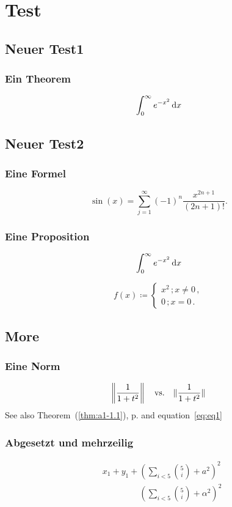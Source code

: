 \chapter{Test}\label{chap:a1}
\section{Neuer Test1}
\subsection{Ein Theorem}
\begin{theorem}\label{thm:a1-1.1}
\[
\int_{0}^{\infty} e^{-x^{2}} \mathop{}\!\mathrm{d}{x}
\]
\end{theorem}
\section{Neuer Test2}
\subsection{Eine Formel}
\begin{equation}\label{eq:eq1}
	\sin(x) = \sum_{j=1}^{\infty} (-1)^{n} \frac{ x^{2n+1} }{ (2n+1)! } .
\end{equation}
\subsection{Eine Proposition}
\begin{proposition}
\[
\int_{0}^{\infty} e^{-x^{2}} \mathop{}\!\mathrm{d}{x}
\]
\end{proposition}
\begin{corollary}
%
\[
	f( x ) \coloneqq 
		\begin{cases}
			x^{ 2 } \, ; x \neq 0 \, , \\
			0 \, ; x = 0 \, .
		\end{cases}
\]
%
\end{corollary}
\section{More}
\subsection{Eine Norm}
%
\[
	\left\|\frac{ 1 }{ 1 + t^{ 2 } }\right\|
	\quad \mbox{vs.} \quad
	 \|\frac{ 1 }{ 1 + t^{ 2 } }\|
\]
%
See also Theorem~(\ref{thm:a1-1.1}), p.\;\pageref{thm:a1-1.1} and equation~\eqref{eq:eq1}

\subsection{Abgesetzt und mehrzeilig}
\begin{align*}
	&x_{1} + y_{1} + \left( \sum_{i < 5} \binom{5}{i} + a^{2} \right)^{2}\\
	&\phantom{x_{1} + y_{1} + {}}
	\left( \sum_{i < 5} \binom{5}{i} + \alpha^{2} \right)^{2}
\end{align*}